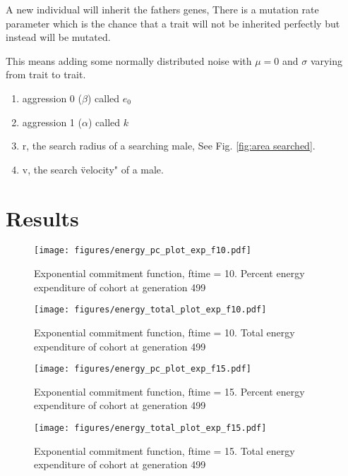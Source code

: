 \documentclass[a4paper,11pt]{article}
\begin{document}
A new individual will inherit the fathers genes,
There is a mutation rate parameter which is the chance that a trait will not be inherited perfectly but instead will be mutated.

This means adding some normally distributed noise with $\mu = 0$ and $\sigma$ varying from trait to trait.

\begin{enumerate}
    \item aggression 0 ($\beta$) called $e_0$
    \item aggression 1 ($\alpha$) called $k$
    
    \item r, the search radius of a searching male, See Fig. \ref{fig:area searched}.
    \item v, the search \"velocity" of a male.
\end{enumerate}

\clearpage

\section{Results} %
\label{sec:results}
\begin{figure}[h!]
    \centering
    \texttt{[image: figures/energy\_pc\_plot\_exp\_f10.pdf]}
    \caption{Exponential commitment function, ftime = 10. Percent energy expenditure of cohort at generation 499}
    \label{fig:energy pc}

    \centering
    \texttt{[image: figures/energy\_total\_plot\_exp\_f10.pdf]}
    \caption{Exponential commitment function, ftime = 10. Total energy expenditure of cohort at generation 499}
    \label{fig:energy total}
\end{figure}
\clearpage

\begin{figure}[h!]
    \centering
    \texttt{[image: figures/energy\_pc\_plot\_exp\_f15.pdf]}
    \caption{Exponential commitment function, ftime = 15. Percent energy expenditure of cohort at generation 499}
    \label{fig:var energy pc}
    \centering

    \texttt{[image: figures/energy\_total\_plot\_exp\_f15.pdf]}
    \caption{Exponential commitment function, ftime = 15. Total energy expenditure of cohort at generation 499}
    \label{fig:var energy total}
\end{figure}
\end{document}
